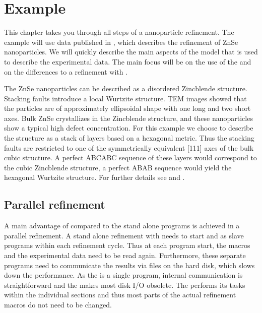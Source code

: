 
\chapter{Example \label{example}}

This chapter takes you through all steps of a nanoparticle refinement.
The example will use data published in \cite{chneko2007}, which describes 
the refinement of ZnSe nanoparticles. We will quickly describe the main 
aspects of the model that is used to describe the experimental data. 
The main focus will be on the use of the \Suite and on the differences
to a refinement with \diffev.

The ZnSe nanoparticles can be described as a disordered Zincblende
structure. Stacking faults introduce a local Wurtzite structure. TEM 
images showed that the particles are of approximately ellipsoidal shape
with one long and two short axes.
Bulk ZnSe crystallizes in the Zincblende structure, and these nanoparticles
show a typical high defect concentration. 
For this example we choose to describe the structure as a stack of
layers based on a hexagonal metric. Thus the stacking faults are restricted
to one of the symmetrically equivalent [111] axes of the bulk cubic structure. 
A perfect ABCABC sequence of these layers would correspond to the  cubic
Zincblende structure, a perfect ABAB sequence would yield the hexagonal 
Wurtzite structure. For further details see \cite{chneko2007} and 
\cite{nedpro}.

\section{Parallel refinement \label{exa-par}}

A main advantage of \Suite compared to the stand alone programs is achieved 
in a parallel refinement. A stand alone refinement with \Diffev needs to
start \Discus and \Kuplot as slave programs within each refinement cycle.
Thus at each program start, the macros and the experimental data need to 
be read again. Furthermore, these separate programs need to communicate
the results via files on the hard disk, which slows down the performance. 
As the \Suite is a single program, internal communication is straightforward
and the makes most disk I/O obsolete. The \Suite performs its tasks 
within the individual sections and thus most parts of the actual refinement 
macros do not need to be changed.

